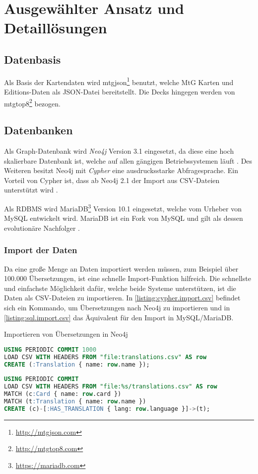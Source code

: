 \section{Ausgewählter Ansatz und Detaillösungen}\label{ch:ansatz}

\subsection{Datenbasis}
Als Basis der Kartendaten wird mtgjson\footnote{\url{http://mtgjson.com}} benutzt, welche \ac{MtG} Karten und Editions-Daten als \ac{JSON}-Datei bereitstellt. Die Decks hingegen werden von mtgtop8\footnote{\url{http://mtgtop8.com}} bezogen.

\subsection{Datenbanken}
Als Graph-Datenbank wird \emph{Neo4j} Version 3.1 eingesetzt, da diese eine hoch skalierbare Datenbank ist, welche auf allen gängigen Betriebssystemen läuft \cite{goel2015neo4j}. Des Weiteren besitzt Neo4j mit \emph{Cypher} eine ausdrucksstarke Abfragesprache. Ein Vorteil von Cypher ist, dass ab Neo4j 2.1 der Import aus \ac{CSV}-Dateien unterstützt wird \cite{panzarino2014cypher}. 

Als \ac{RDBMS} wird MariaDB\footnote{\url{https://mariadb.com}} Version 10.1 eingesetzt, welche vom Urheber von MySQL entwickelt wird. MariaDB ist ein Fork von MySQL und gilt als dessen evolutionäre Nachfolger \cite{bartholomew2013getting}.

\subsubsection{Import der Daten}
Da eine große Menge an Daten importiert werden müssen, zum Beispiel über 100.000 Übersetzungen, ist eine schnelle Import-Funktion hilfreich. Die schnellste und einfachste Möglichkeit dafür, welche beide Systeme unterstützen, ist die Daten als \ac{CSV}-Dateien zu importieren. In \autoref{listing:cypher.import.csv} befindet sich ein Kommando, um Übersetzungen nach Neo4j zu importieren und in \autoref{listing:sql.import.csv} das Äquivalent für den Import in MySQL/MariaDB.

\begin{listing}[t]
    \caption{Importieren von Übersetzungen in Neo4j}
    \label{listing:cypher.import.csv}
    \begin{lstlisting}[language=SQL]
USING PERIODIC COMMIT 1000
LOAD CSV WITH HEADERS FROM "file:translations.csv" AS row
CREATE (:Translation { name: row.name });
    
USING PERIODIC COMMIT
LOAD CSV WITH HEADERS FROM "file:%s/translations.csv" AS row
MATCH (c:Card { name: row.card })
MATCH (t:Translation { name: row.name })
CREATE (c)-[:HAS_TRANSLATION { lang: row.language }]->(t);
    \end{lstlisting}
\end{listing}

